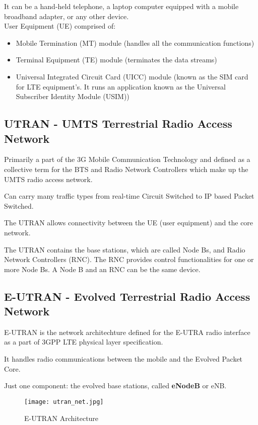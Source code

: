 It can be a hand-held telephone, a laptop computer equipped with a mobile
broadband adapter, or any other device. \\

User Equipment (UE) comprised of:

\begin{itemize}
  \item Mobile Termination (MT) module (handles all the communication
functions)
  \item Terminal Equipment (TE) module (terminates the data streams)
  \item Universal Integrated Circuit Card (UICC) module (known as the SIM card
for LTE equipment's. It runs an application known as the Universal Subscriber
Identity Module (USIM))
\end{itemize}

\subsection{UTRAN - UMTS Terrestrial Radio Access Network}

Primarily a part of the 3G Mobile Communication Technology and defined as a
collective term for the BTS and Radio Network Controllers which make up the
UMTS radio access network.

Can carry many traffic types from real-time Circuit Switched to IP based Packet
Switched.

The UTRAN allows connectivity between the UE (user equipment) and the core
network.

The UTRAN contains the base stations, which are called Node Bs, and Radio
Network Controllers (RNC).
The RNC provides control functionalities for one or more Node Bs.
A Node B and an RNC can be the same device.

\subsection{E-UTRAN - Evolved Terrestrial Radio Access Network}

E-UTRAN is the network architechture defined for the E-UTRA radio interface as
a part of 3GPP LTE physical layer specification.

It handles radio communications between the mobile and the Evolved Packet Core.

Just one component: the evolved base stations, called \textbf{eNodeB} or eNB.

\begin{figure}[H]
  \centering
  \texttt{[image: utran\_net.jpg]}
  \caption{E-UTRAN Architecture}
  \label{fig:utran_net}
\end{figure}

